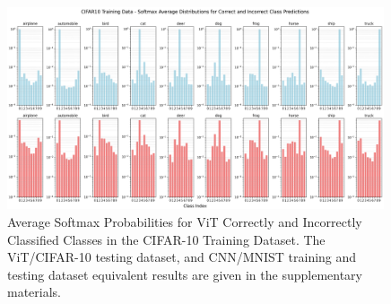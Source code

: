 \begin{figure}[ht]
    \centering
    \includegraphics[width=0.99\textwidth]{Figures/CIFAR10_training_plot_centroid_distance_bars.png}
    \caption{Average Softmax Probabilities for ViT Correctly and Incorrectly Classified Classes in the CIFAR-10 Training Dataset. The ViT/CIFAR-10 testing dataset, and CNN/MNIST training and testing dataset equivalent results are given in the supplementary materials.}
    \label{fig:CIFAR10_training_plot_centroid_distance_bars.png}
\end{figure}